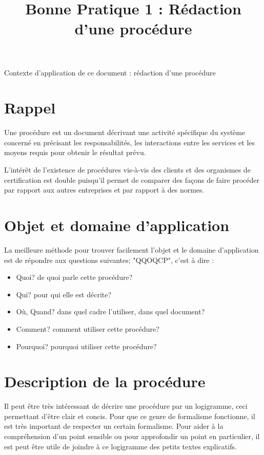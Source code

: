 \documentclass[a4paper]{article}
\begin{document}
\title{Bonne Pratique 1 : Rédaction d'une procédure}
\maketitle

Contexte d'application de ce document : rédaction d'une procédure

\section{Rappel}

Une procédure est un document décrivant une activité spécifique du système concerné en précisant les responsabilités, les interactions entre les services et les moyens requis pour obtenir le résultat prévu.

L'intérêt de l'existence de procédures vis-à-vis des clients et des organismes de certification est double puisqu'il permet de comparer des façons de faire procéder par rapport aux autres entreprises et par rapport à des normes.

\section{Objet et domaine d'application}

La meilleure méthode pour trouver facilement l'objet et le domaine d'application est de répondre aux questions suivantes; "QQOQCP", c'est à dire :

\begin{itemize}
\item Quoi? de quoi parle cette procédure?
\item Qui? pour qui elle est décrite?
\item Où, Quand? dans quel cadre l'utiliser, dans quel document?
\item Comment? comment utiliser cette procédure?
\item Pourquoi? pourquoi utiliser cette procédure?
\end{itemize}

\section{Description de la procédure}

Il peut être très intéressant de décrire une procédure par un logigramme, ceci permettant d'être clair et concis. Pour que ce genre de formalisme fonctionne, il est très important de respecter un certain formalisme. Pour aider à la compréhension d'un point sensible ou pour approfondir un point en particulier, il est peut être utile de joindre à ce logigramme des petits textes explicatifs.
\end{document}
